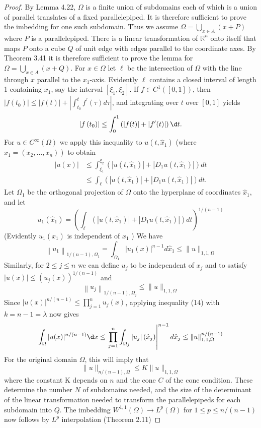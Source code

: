 \begin{proof}
  By Lemma 4.22, $\Omega$ is a finite union of subdomains each of which is a union of parallel 
  translates of a fixed parallelepiped. It is therefore sufficient to prove the imbedding for one 
  such subdomain. Thus we assume $\Omega=\bigcup_{x \in A}(x+P)$ where $P$ is a parallelepiped. 
  There is a linear transformation of $\mathbb{R}^n$ onto itself that
  maps $P$ onto a cube $Q$ of unit edge with edges parallel to the coordinate axes.
  By Theorem 3.41 it is therefore sufficient to prove the lemma
  for $\Omega=\bigcup_{x \in A}(x+Q)$. For $x \in \Omega$ let $\ell$ be the intersection of 
  $\Omega$ with the line through $x$ parallel to the $x_1$-axis. Evidently $\ell$ contains a 
  closed interval of length 1 containing $x_1$, say the interval $\left[\xi_1, \xi_2\right]$.
  If $f \in C^1([0,1])$, then $\left|f\left(t_0\right)\right| \leq|f(t)|+\left|\int_{t_0}^t f^{\prime}(\tau) d \tau\right|$, and integrating over $t$ over $[0,1]$ yields
  \[
  \left|f\left(t_0\right)\right|
    \leq \int_0^1\left(|f(t)|+\left|f^{\prime}(t)\right|\right) \d t.
  \]
  For $u \in C^{\infty}(\Omega)$ we apply this inequality to $u\left(t, \hat{x}_1\right)$ (where $\left.\hat{x}_1=\left(x_2, \ldots, x_n\right)\right)$ to obtain
  \[
  \begin{aligned}
  |u(x)| & \leq \int_{\xi_1}^{\xi_2}\left(\left|u\left(t, \hat{x}_1\right)\right|+\left|D_1 u\left(t, \hat{x}_1\right)\right|\right) d t \\
  & \leq \int_{\ell}\left(\left|u\left(t, \hat{x}_1\right)\right|+\left|D_1 u\left(t, \hat{x}_1\right)\right|\right) d t .
  \end{aligned}
  \]
  Let $\Omega_1$ be the orthogonal projection of $\Omega$ onto the hyperplane of coordinates $\hat{x}_1$, and let
  \[
  u_1\left(\hat{x}_1\right)=\left(\int_{\ell}\left(\left|u\left(t, \hat{x}_1\right)\right|+\left|D_1 u\left(t, \hat{x}_1\right)\right|\right) d t\right)^{1 /(n-1)}
  \]
  (Evidently $u_1\left(\hat{x}_1\right)$ is independent of $x_1$ ) We have
  \[
  \left\|u_1\right\|_{1 /(n-1), \Omega_1}=\int_{\Omega_1}\left|u_1(x)\right|^{n-1} d \hat{x}_1 \leq\|u\|_{1,1, \Omega}
  \]
  Similarly, for $2 \leq j \leq n$ we can define $u_j$ to be independent of $x_j$ and to satisfy $|u(x)| \leq\left(u_j(x)\right)^{1 /(n-1)}$ and
  \[
  \left\|u_j\right\|_{1 /(n-1), \Omega_j} \leq\|u\|_{1,1, \Omega}
  \]
  Since $|u(x)|^{n /(n-1)} \leq \prod_{j=1}^n u_j(x)$, applying inequality (14) with $k=n-1=\lambda$ now gives
  \[
  \int_{\Omega}|u(x)|^{n /(n-1)} \d x \leq\left.\prod_{j=1}^n \int_{\Omega_j}\left|u_j\right|\left(\hat{x}_j\right)\right|^{n-1} d \hat{x}_j \leq\|u\|_{1,1, \Omega}^{n /(n-1)}
  \]
  For the original domain $\Omega$, this will imply that
  \[
  \|u\|_{n /(n-1), \Omega} \leq K\|u\|_{1,1, \Omega}
  \]
  where the constant $\mathrm{K}$ depends on $n$ and the cone $C$ of the cone condition. These determine the number $N$ of subdomains needed, and the size of the determinant of the linear transformation needed to transform the parallelepipeds for each subdomain into $Q$. The imbedding $W^{1,1}(\Omega) \rightarrow L^p(\Omega)$ for $1 \leq p \leq n /(n-1)$ now follows by $L^p$ interpolation (Theorem 2.11)
\end{proof}


